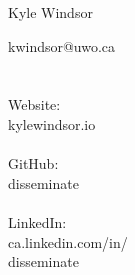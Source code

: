 \documentclass{article}
\begin{document}
{
	{\Huge Kyle Windsor}\\
	\vspace{0.1in}
}

\begin{minipage}[t]{0.25\hsize}\color{contact} %
	kwindsor@uwo.ca\\
	\\\\
	Website:\\
	kylewindsor.io\\
	\\
	GitHub:\\
	disseminate\\
	\\
	LinkedIn:\\
	ca.linkedin.com/in/\\
	disseminate\\
\end{minipage}
\end{document}
